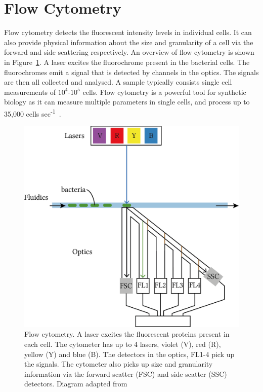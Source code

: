 \section{Flow Cytometry}
Flow cytometry detects the fluorescent intensity levels in individual cells. It can also provide physical information about the size and granularity of a cell via the forward and side scattering respectively. An overview of flow cytometry is shown in Figure~\ref{fig:flow_overv}. A laser excites the fluorochrome present in the bacterial cells. The fluorochromes emit a signal that is detected by channels in the optics. The signals are then all collected and analysed. A sample typically consists single cell measurements of $10^4$-$10^5$ cells. %
Flow cytometry is a powerful tool for synthetic biology as it can measure multiple parameters in single cells, and process up to 35,000 cells sec\textsuperscript{-1}~\autocite{Anonymous:2015tj}. 


\begin{figure}[tb]
	\begin{center}
		\includegraphics[scale=0.9]{../../chapters/chapterBackgr/images/flow-overview.png}
	\caption[Flow cytometry experimental setup]{\label{fig:flow_overv}Flow cytometry. A laser excites the fluorescent proteins present in each cell. The cytometer has up to 4 lasers, violet (V), red (R), yellow (Y) and blue (B). The detectors in the optics, FL1-4 pick up the signals. The cytometer also picks up size and granularity information via the forward scatter (FSC) and side scatter (SSC) detectors. Diagram adapted from~\autocite{FlowDiagram}}
	\end{center}
\end{figure}






